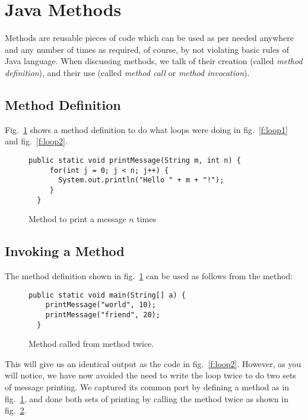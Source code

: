 \documentclass[12pt,a4paper]{article}
\begin{document}
\section{Java Methods}
Methods are reusable pieces of code which can be used as per needed anywhere and any number of times as required, of course, by not violating basic rules of Java language. When discussing methods, we talk of their creation (called \emph{method definition}), and their use (called \emph{method call} or \emph{method invocation}).

\subsection{Method Definition}
Fig.~\ref{f:meth1} shows a method definition to do what loops were doing in fig.~\ref{f:loop1} and fig.~\ref{f:loop2}.
\begin{figure}[H]
\begin{lstlisting}[frame=single]
  public static void printMessage(String m, int n) {
     for(int j = 0; j < n; j++) {
       System.out.println("Hello " + m + "!");
     }
  }
\end{lstlisting}
\caption{Method \lstinline@printMessage@ to print a message $n$ times}
\label{f:meth1}
\end{figure}

\subsection{Invoking a Method}
The method definition shown in fig.~\ref{f:meth1} can be used as follows from the \lstinline@main@ method:
\begin{figure}[H]
\begin{lstlisting}[frame=single]
  public static void main(String[] a) {
    printMessage("world", 10);
    printMessage("friend", 20);
  }
\end{lstlisting}
\caption{Method \lstinline@printMessage@ called from \lstinline@main@ method twice.}
\label{f:methcall1}
\end{figure}

This will give us an identical output as the code in fig.~\ref{f:loop2}. However, as you will notice, we have now avoided the need to write the loop twice to do two sets of message printing. We captured its common part by defining a method as in fig.~\ref{f:meth1}, and done both sets of printing by calling the method twice as shown in fig.~\ref{f:methcall1}.
\end{document}
